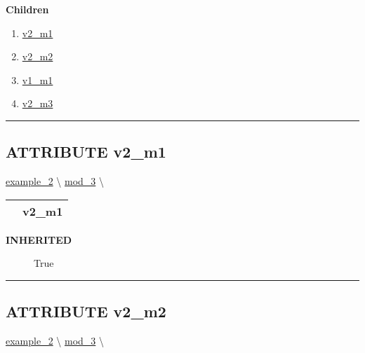 \par


\textbf{Children}
\begin{enumerate}
\item \hyperlink{ecldoc:intest.example_2.mod_1.v2_m1}{v2\_m1}
\item \hyperlink{ecldoc:intest.example_2.mod_2.v2_m2}{v2\_m2}
\item \hyperlink{ecldoc:intest.example_2.mod_3.v1_m1}{v1\_m1}
\item \hyperlink{ecldoc:intest.example_2.mod_3.v2_m3}{v2\_m3}
\end{enumerate}

\rule{\linewidth}{0.5pt}

\subsection*{\textsf{\colorbox{headtoc}{\color{white} ATTRIBUTE}
v2\_m1}}

\hypertarget{ecldoc:intest.example_2.mod_1.v2_m1}{}
\hspace{0pt} \hyperlink{ecldoc:intest.example_2}{example_2} \textbackslash 
\hspace{0pt} \hyperlink{ecldoc:intest.example_2.mod_3}{mod_3} \textbackslash 

{\renewcommand{\arraystretch}{1.5}
\begin{tabularx}{\textwidth}{|>{\raggedright\arraybackslash}l|X|}
\hline
\hspace{0pt}\mytexttt{\color{red} } & \textbf{v2\_m1} \\
\hline
\end{tabularx}
}

\par

\par
\begin{description}
\item [\colorbox{tagtype}{\color{white} \textbf{\textsf{INHERITED}}}] \textbf{\underline{}} True
\end{description}

\rule{\linewidth}{0.5pt}
\subsection*{\textsf{\colorbox{headtoc}{\color{white} ATTRIBUTE}
v2\_m2}}

\hypertarget{ecldoc:intest.example_2.mod_2.v2_m2}{}
\hspace{0pt} \hyperlink{ecldoc:intest.example_2}{example_2} \textbackslash 
\hspace{0pt} \hyperlink{ecldoc:intest.example_2.mod_3}{mod_3} \textbackslash 

